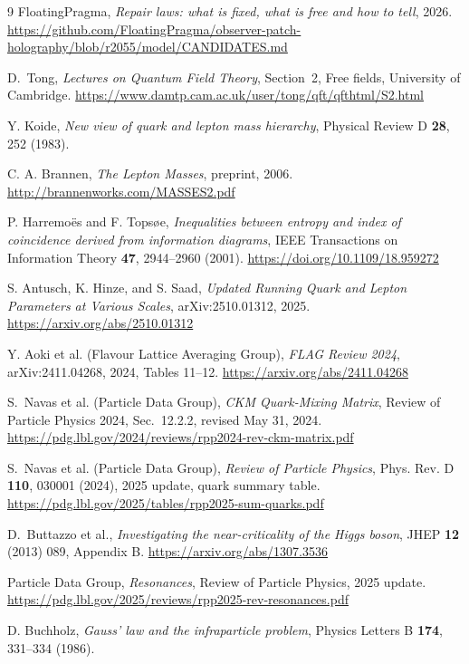 \documentclass[11pt]{article}
\begin{document}
\begin{thebibliography}{9}
FloatingPragma,
\emph{Repair laws: what is fixed, what is free and how to tell},
2026.
\url{https://github.com/FloatingPragma/observer-patch-holography/blob/r2055/model/CANDIDATES.md}

D.\ Tong,
\emph{Lectures on Quantum Field Theory}, Section~2, Free fields,
University of Cambridge.
\url{https://www.damtp.cam.ac.uk/user/tong/qft/qfthtml/S2.html}

Y. Koide,
\emph{New view of quark and lepton mass hierarchy},
Physical Review D \textbf{28}, 252 (1983).

C. A. Brannen,
\emph{The Lepton Masses},
preprint, 2006.
\url{http://brannenworks.com/MASSES2.pdf}

P. Harremo\"es and F. Tops\o e,
\emph{Inequalities between entropy and index of coincidence derived from
information diagrams},
IEEE Transactions on Information Theory \textbf{47}, 2944--2960 (2001).
\url{https://doi.org/10.1109/18.959272}

S. Antusch, K. Hinze, and S. Saad,
\emph{Updated Running Quark and Lepton Parameters at Various Scales},
arXiv:2510.01312, 2025.
\url{https://arxiv.org/abs/2510.01312}

Y. Aoki et al. (Flavour Lattice Averaging Group),
\emph{FLAG Review 2024},
arXiv:2411.04268, 2024,
Tables 11--12.
\url{https://arxiv.org/abs/2411.04268}

S.~Navas et al. (Particle Data Group),
\emph{CKM Quark-Mixing Matrix},
Review of Particle Physics 2024, Sec.~12.2.2, revised May 31, 2024.
\url{https://pdg.lbl.gov/2024/reviews/rpp2024-rev-ckm-matrix.pdf}

S.~Navas et al. (Particle Data Group),
\emph{Review of Particle Physics}, Phys. Rev. D \textbf{110}, 030001 (2024),
2025 update, quark summary table.
\url{https://pdg.lbl.gov/2025/tables/rpp2025-sum-quarks.pdf}

D.~Buttazzo et al.,
\emph{Investigating the near-criticality of the Higgs boson},
JHEP \textbf{12} (2013) 089, Appendix B.
\url{https://arxiv.org/abs/1307.3536}

Particle Data Group,
\emph{Resonances},
Review of Particle Physics, 2025 update.
\url{https://pdg.lbl.gov/2025/reviews/rpp2025-rev-resonances.pdf}

D. Buchholz,
\emph{Gauss' law and the infraparticle problem},
Physics Letters B \textbf{174}, 331--334 (1986).


\end{thebibliography}
\end{document}
